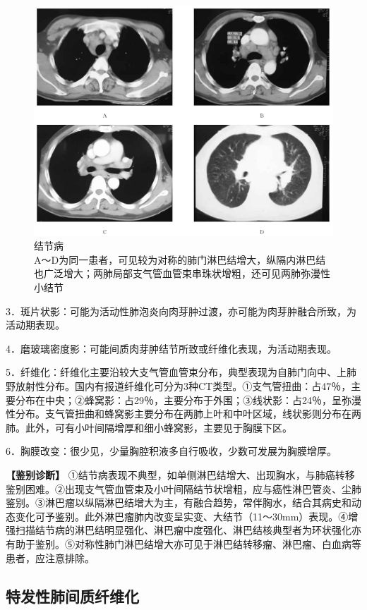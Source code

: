 \begin{figure}[!htbp]
 \centering
 \includegraphics[width=.7\textwidth,height=\textheight,keepaspectratio]{./images/Image00235.jpg}
 \captionsetup{justification=centering}
 \caption{结节病\\{\small A～D为同一患者，可见较为对称的肺门淋巴结增大，纵隔内淋巴结也广泛增大；两肺局部支气管血管束串珠状增粗，还可见两肺弥漫性小结节}}
 \label{fig9-40}
  \end{figure} 

3．斑片状影：可能为活动性肺泡炎向肉芽肿过渡，亦可能为肉芽肿融合所致，为活动期表现。

4．磨玻璃密度影：可能间质肉芽肿结节所致或纤维化表现，为活动期表现。

5．纤维化：纤维化主要沿较大支气管血管束分布，典型表现为自肺门向中、上肺野放射性分布。国内有报道纤维化可分为3种CT类型。①支气管扭曲：占47％，主要分布在中央；②蜂窝影：占29％，主要分布于外围；③线状影：占24％，呈弥漫性分布。支气管扭曲和蜂窝影主要分布在两肺上叶和中叶区域，线状影则分布在两肺。此外，可有小叶间隔增厚和细小蜂窝影，主要见于胸膜下区。

6．胸膜改变：很少见，少量胸腔积液多自行吸收，少数可发展为胸膜增厚。

\textbf{【鉴别诊断】}
①结节病表现不典型，如单侧淋巴结增大、出现胸水，与肺癌转移鉴别困难。②出现支气管血管束及小叶间隔结节状增粗，应与癌性淋巴管炎、尘肺鉴别。③淋巴瘤以纵隔淋巴结增大为主，有融合趋势，常伴胸水，结合其病史和动态变化可予鉴别。此外淋巴瘤肺内改变呈实变、大结节（11～30mm）表现。④增强扫描结节病的淋巴结明显强化、淋巴瘤中度强化、淋巴结核典型者为环状强化亦有助于鉴别。⑤对称性肺门淋巴结增大亦可见于淋巴结转移瘤、淋巴瘤、白血病等患者，应注意排除。

\subsection{特发性肺间质纤维化}

